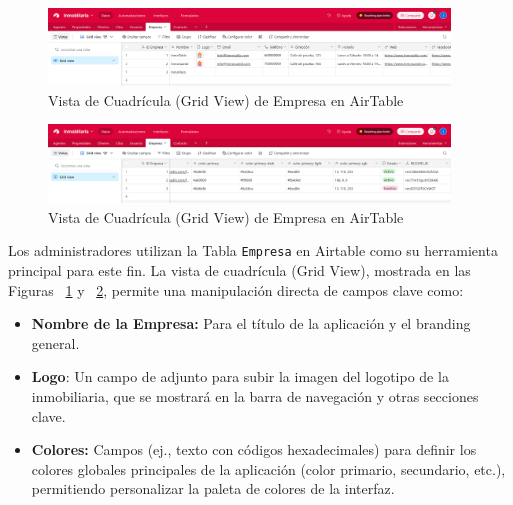 \begin{enumerate}
    \begin{figure}[H]
        \begin{center}
            \includegraphics[width = 0.95\textwidth]{Figuras/tablaempresa1.png}
        \end{center}
        \caption{\label{fig:tablaempresa1} Vista de Cuadrícula (Grid View) de Empresa en AirTable}
    \end{figure}

    \begin{figure}[H]
        \begin{center}
            \includegraphics[width = 0.95\textwidth]{Figuras/tablaempresa2.png}
        \end{center}
        \caption{\label{fig:tablaempresa2} Vista de Cuadrícula (Grid View) de Empresa en AirTable}
    \end{figure}

    Los administradores utilizan la Tabla \texttt{Empresa} en Airtable como su herramienta principal para este fin. La vista de cuadrícula (Grid View), mostrada en las Figuras ~\ref{fig:tablaempresa1} y ~\ref{fig:tablaempresa2}, permite una manipulación directa de campos clave como:

    \begin{itemize}
        \item \textbf{Nombre de la Empresa:} Para el título de la aplicación y el branding general.

        \item \textbf{Logo}: Un campo de adjunto para subir la imagen del logotipo de la inmobiliaria, que se mostrará en la barra de navegación y otras secciones clave.

        \item \textbf{Colores:} Campos (ej., texto con códigos hexadecimales) para definir los colores globales principales de la aplicación (color primario, secundario, etc.), permitiendo personalizar la paleta de colores de la interfaz.


\end{itemize}
\end{enumerate}
